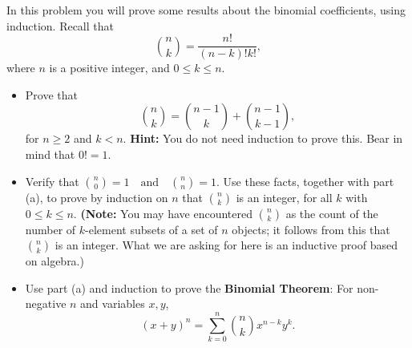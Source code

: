 \documentclass[12pt]{article}
\newenvironment{problem}[2][Problem]{\begin{trivlist}
\item[\hskip \labelsep {\bfseries #1}\hskip \labelsep {\bfseries #2.}]}{\end{trivlist}}
\begin{document}
\begin{problem}{14}
In this problem you will prove some results about the binomial coefficients, using
induction. Recall that
\[
	\binom{n}{k} = \frac{n!}{(n - k)!k!},
\]
where \( n \) is a positive integer, and \( 0 \leq k \leq n \).

\begin{itemize}
	\item[(a)] Prove that
	      \[
		      \binom{n}{k} = \binom{n-1}{k} + \binom{n-1}{k-1},
	      \]
	      for \( n \geq 2 \) and \( k < n \). \textbf{Hint:} You do not need induction to prove this. Bear in mind
	      that \( 0! = 1 \).

	\item[(b)] Verify that
	      $
		      \binom{n}{0} = 1 \quad \text{and} \quad \binom{n}{n} = 1.
	      $
	      Use these facts, together with part (a), to prove
	      by induction on \( n \) that \( \binom{n}{k} \) is an integer, for all \( k \) with \( 0 \leq k \leq n \). \textbf{(Note:} You
	      may have encountered \( \binom{n}{k} \) as the count of the number of \( k \)-element subsets of a
	      set of \( n \) objects; it follows from this that \( \binom{n}{k} \) is an integer. What we are asking
	      for here is an inductive proof based on algebra.)

	\item[(c)] Use part (a) and induction to prove the \textbf{Binomial Theorem}: For non-negative
	      \( n \) and variables \( x, y \),
	      \[
		      (x + y)^n = \sum_{k=0}^{n} \binom{n}{k} x^{n-k} y^k.
	      \]
\end{itemize}

\end{problem}
\end{document}
